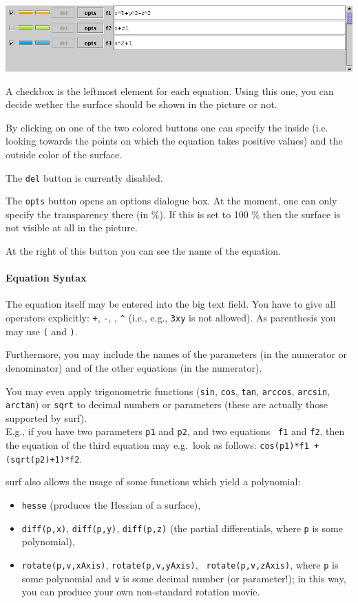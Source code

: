 \documentclass{article}
\begin{document}
\ \\\includegraphics[scale=0.35]{surfex_equations}

A checkbox is the leftmost element for each equation.
Using this one, you can decide wether the surface should be shown in the
picture or not.

By clicking on one of the two colored buttons one can specify the inside (i.e.
looking towards the points on which the equation takes positive values) and
the outside color of the surface.

The {\tt del} button is currently disabled.

The {\tt opts} button opens an options dialogue box.
At the moment, one can only specify the transparency there (in \%).
If this is set to 100 \% then the surface is not visible at all in the
picture.

At the right of this button you can see the name of the equation.

\paragraph{Equation Syntax}

The equation itself may be entered into the big text field.
You have to give all operators explicitly: {\tt +}, {\tt -}, {\tt *},
{\tt \^{}} (i.e., e.g., {\tt 3xy} is not allowed).
As parenthesis you may use {\tt (} and {\tt )}.

Furthermore, you may include the names of the parameters (in the numerator or
denominator) and of the other equations (in the numerator).

You may even apply trigonometric functions ({\tt sin}, {\tt cos}, {\tt tan},
{\tt arccos}, {\tt arcsin}, {\tt arctan}) or {\tt sqrt} to decimal numbers or
parameters (these are actually those supported by {\sc surf}).\\
E.g., if you have two parameters {\tt p1} and {\tt p2}, and two equations {\tt
  f1} and {\tt f2}, then the equation of the third equation may e.g.\ look as
follows: {\tt cos(p1)*f1 + (sqrt(p2)+1)*f2}.

{\sc surf} also allows the usage of some functions which yield a polynomial:
\begin{itemize}
\item {\tt hesse} (produces the Hessian of a surface),
\item
  {\tt diff(p,x)}, {\tt diff(p,y)}, {\tt diff(p,z)} (the partial
  differentials, where {\tt p} is some polynomial),
\item {\tt rotate(p,v,xAxis)}, {\tt rotate(p,v,yAxis)}, {\tt
  rotate(p,v,zAxis)}, where {\tt p} is some polynomial and {\tt v} is
  some decimal number (or parameter!); in this way, you can produce your own
  non-standard rotation movie.
\end{itemize}
\end{document}
